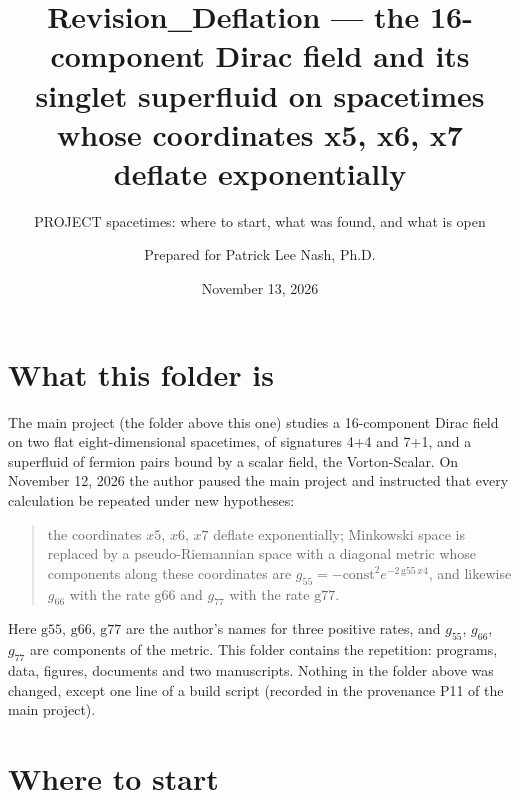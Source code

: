 \documentclass[
  10pt,
]{article}
\title{Revision\_Deflation --- the 16-component Dirac field and its
singlet superfluid on spacetimes whose coordinates x5, x6, x7 deflate
exponentially}
\subtitle{PROJECT spacetimes: where to start, what was found, and what
is open}
\author{Prepared for Patrick Lee Nash, Ph.D.}
\date{November 13, 2026}
\begin{document}
\maketitle

\hypertarget{what-this-folder-is}{%
\section{What this folder is}\label{what-this-folder-is}}

The main project (the folder above this one) studies a 16-component
Dirac field on two flat eight-dimensional spacetimes, of signatures 4+4
and 7+1, and a superfluid of fermion pairs bound by a scalar field, the
Vorton-Scalar. On November 12, 2026 the author paused the main project
and instructed that every calculation be repeated under new hypotheses:

\begin{quote}
the coordinates \(x5\), \(x6\), \(x7\) deflate exponentially; Minkowski
space is replaced by a pseudo-Riemannian space with a diagonal metric
whose components along these coordinates are
\(g_{55}=-\mathrm{const}^2e^{-2\,\mathrm{g55}\,x4}\), and likewise
\(g_{66}\) with the rate \(\mathrm{g66}\) and \(g_{77}\) with the rate
\(\mathrm{g77}\).
\end{quote}

Here \(\mathrm{g55}\), \(\mathrm{g66}\), \(\mathrm{g77}\) are the
author's names for three positive rates, and \(g_{55}\), \(g_{66}\),
\(g_{77}\) are components of the metric. This folder contains the
repetition: programs, data, figures, documents and two manuscripts.
Nothing in the folder above was changed, except one line of a build
script (recorded in the provenance P11 of the main project).

\hypertarget{where-to-start}{%
\section{Where to start}\label{where-to-start}}
\end{document}
